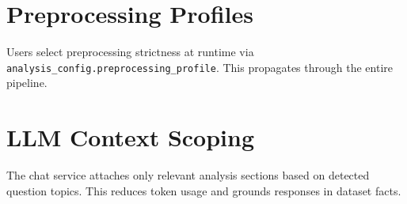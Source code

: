 \section{Preprocessing Profiles}

Users select preprocessing strictness at runtime via \texttt{analysis\_config.preprocessing\_profile}. This propagates through the entire pipeline.

\section{LLM Context Scoping}

The chat service attaches only relevant analysis sections based on detected question topics. This reduces token usage and grounds responses in dataset facts.
